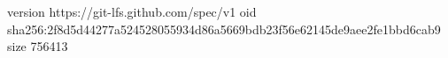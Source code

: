 version https://git-lfs.github.com/spec/v1
oid sha256:2f8d5d44277a524528055934d86a5669bdb23f56e62145de9aee2fe1bbd6cab9
size 756413
